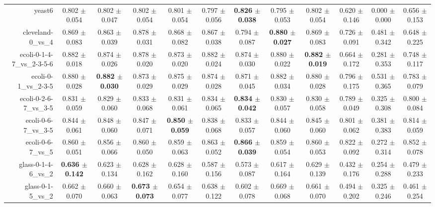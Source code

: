 \begin{table}[!ht]
{\begin{tabular}{r c c c c c c c c c c c}
yeast6 & 0.802 $\pm$ 0.054 & 0.802 $\pm$ 0.047 & 0.802 $\pm$ 0.054 & 0.801 $\pm$ 0.054 & 0.797 $\pm$ 0.056 & \textbf{0.826 $\pm$ 0.038} & 0.795 $\pm$ 0.053 & 0.802 $\pm$ 0.054 & 0.620 $\pm$ 0.146 & 0.000 $\pm$ 0.000 & 0.656 $\pm$ 0.153 \\
cleveland-0\_vs\_4 & 0.869 $\pm$ 0.083 & 0.863 $\pm$ 0.039 & 0.878 $\pm$ 0.031 & 0.868 $\pm$ 0.082 & 0.867 $\pm$ 0.038 & 0.794 $\pm$ 0.087 & \textbf{0.880 $\pm$ 0.027} & 0.869 $\pm$ 0.083 & 0.726 $\pm$ 0.091 & 0.481 $\pm$ 0.342 & 0.648 $\pm$ 0.225 \\
ecoli-0-1-4-7\_vs\_2-3-5-6 & 0.882 $\pm$ 0.018 & 0.874 $\pm$ 0.026 & 0.878 $\pm$ 0.020 & 0.873 $\pm$ 0.020 & 0.882 $\pm$ 0.024 & 0.874 $\pm$ 0.030 & 0.880 $\pm$ 0.022 & \textbf{0.882 $\pm$ 0.019} & 0.664 $\pm$ 0.172 & 0.281 $\pm$ 0.353 & 0.748 $\pm$ 0.117 \\
ecoli-0-1\_vs\_2-3-5 & 0.880 $\pm$ 0.028 & \textbf{0.882 $\pm$ 0.030} & 0.873 $\pm$ 0.029 & 0.875 $\pm$ 0.029 & 0.874 $\pm$ 0.028 & 0.871 $\pm$ 0.045 & 0.882 $\pm$ 0.034 & 0.880 $\pm$ 0.028 & 0.796 $\pm$ 0.175 & 0.531 $\pm$ 0.365 & 0.783 $\pm$ 0.079 \\
ecoli-0-2-6-7\_vs\_3-5 & 0.831 $\pm$ 0.059 & 0.829 $\pm$ 0.060 & 0.833 $\pm$ 0.068 & 0.831 $\pm$ 0.061 & 0.834 $\pm$ 0.065 & \textbf{0.834 $\pm$ 0.042} & 0.830 $\pm$ 0.057 & 0.830 $\pm$ 0.058 & 0.789 $\pm$ 0.049 & 0.325 $\pm$ 0.308 & 0.800 $\pm$ 0.084 \\
ecoli-0-6-7\_vs\_3-5 & 0.844 $\pm$ 0.061 & 0.848 $\pm$ 0.060 & 0.847 $\pm$ 0.071 & \textbf{0.850 $\pm$ 0.059} & 0.838 $\pm$ 0.068 & 0.833 $\pm$ 0.057 & 0.844 $\pm$ 0.060 & 0.845 $\pm$ 0.060 & 0.801 $\pm$ 0.062 & 0.381 $\pm$ 0.383 & 0.814 $\pm$ 0.059 \\
ecoli-0-6-7\_vs\_5 & 0.860 $\pm$ 0.051 & 0.856 $\pm$ 0.066 & 0.860 $\pm$ 0.050 & 0.859 $\pm$ 0.063 & 0.863 $\pm$ 0.052 & \textbf{0.866 $\pm$ 0.039} & 0.859 $\pm$ 0.054 & 0.860 $\pm$ 0.053 & 0.822 $\pm$ 0.092 & 0.272 $\pm$ 0.314 & 0.852 $\pm$ 0.078 \\
glass-0-1-4-6\_vs\_2 & \textbf{0.636 $\pm$ 0.142} & 0.623 $\pm$ 0.134 & 0.628 $\pm$ 0.162 & 0.628 $\pm$ 0.160 & 0.587 $\pm$ 0.156 & 0.573 $\pm$ 0.087 & 0.617 $\pm$ 0.164 & 0.629 $\pm$ 0.139 & 0.432 $\pm$ 0.176 & 0.254 $\pm$ 0.288 & 0.479 $\pm$ 0.233 \\
glass-0-1-5\_vs\_2 & 0.662 $\pm$ 0.070 & 0.660 $\pm$ 0.063 & \textbf{0.673 $\pm$ 0.073} & 0.654 $\pm$ 0.077 & 0.638 $\pm$ 0.122 & 0.602 $\pm$ 0.078 & 0.669 $\pm$ 0.068 & 0.661 $\pm$ 0.070 & 0.494 $\pm$ 0.202 & 0.325 $\pm$ 0.246 & 0.461 $\pm$ 0.254 \\

\end{tabular}}
\end{table}
